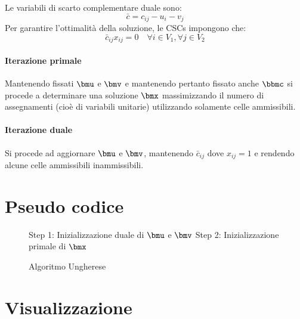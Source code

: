 \documentclass[\main/main.tex]{subfiles}
\begin{document}
Le variabili di scarto complementare duale sono:
\[
	\bar{c} = c_{ij} - u_i - v_j
\]
Per garantire l'ottimalità della soluzione, le CSCs impongono che:
\[
	\bar{c}_{ij}x_{ij} = 0 \quad \forall i \in V_1, \forall j \in V_2
\]

\paragraph*{Iterazione primale} Mantenendo fissati \(\bmu \) e \(\bmv \) e mantenendo pertanto fissato anche \(\bbmc \) si procede a determinare una soluzione \(\bmx \) massimizzando il numero di assegnamenti (cioè di variabili unitarie) utilizzando solamente celle ammissibili.
\paragraph*{Iterazione duale} Si procede ad aggiornare \(\bmu \) e \(\bmv \), mantenendo \(\bar{c}_{ij}\) dove \(x_{ij} = 1\) e rendendo alcune celle ammissibili inammissibili.

\section{Pseudo codice}
\begin{figure}
	\begin{algorithm}[H]
		\SetAlgoLined
		Step 1: Inizializzazione duale di \(\bmu \) e \(\bmv \)\;
		Step 2: Inizializzazione primale di \(\bmx \)\;
		\caption{Algoritmo Ungherese}
	\end{algorithm}
\end{figure}

\section{Visualizzazione}

\begin{figure}
	\Hungarian{}
	\caption{}
\end{figure}
\end{document}
